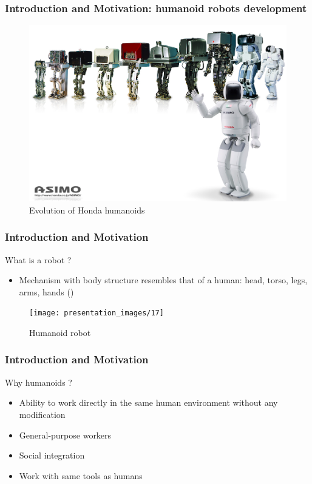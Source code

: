 \documentclass{beamer}
\begin{document}

	\begin{frame}
		\frametitle{Introduction and Motivation: humanoid robots development}
		\begin{figure}[h!]
			\includegraphics[width=0.8\linewidth]{presentation_images/6}
			\caption{Evolution of Honda humanoids}
		\end{figure}
	\end{frame}
	

	\begin{frame}
		\frametitle{Introduction and Motivation}
		\begin{block}{What is a robot ?}
			\begin{itemize}
				\item
					Mechanism with body structure resembles that of a human: head, torso, legs, arms, hands (\cite{hirai1998development})
			\end{itemize}
		\end{block}
		\begin{figure}[h!]
			\begin{minipage}[H]{\linewidth}
				\centering
				\texttt{[image: presentation\_images/17]}
				\caption{Humanoid robot}
			\end{minipage}
		\end{figure}
	\end{frame}
	

	\begin{frame}
		\frametitle{Introduction and Motivation}
		\begin{block}{Why humanoids ?}
			\begin{itemize}
				\item
				Ability to work directly in the same human environment without any modification
				\item
				General-purpose workers
				\item
				Social integration
				\item
				Work with same tools as humans
			\end{itemize}
		\end{block}
	\end{frame}
	
\end{document}
